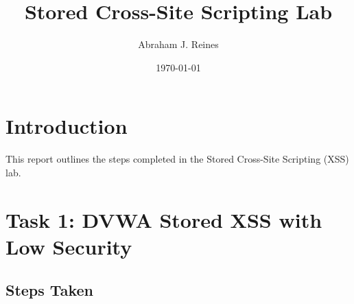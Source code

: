\documentclass[12pt]{article}
\title{Stored Cross-Site Scripting Lab}
\author{Abraham J. Reines}
\date{\today}
\begin{document}
\maketitle

\tableofcontents

\newpage

\section{Introduction}

This report outlines the steps completed in the Stored Cross-Site Scripting (XSS) lab. 

\section{Task 1: DVWA Stored XSS with Low Security}

\subsection{Steps Taken}
\end{document}
